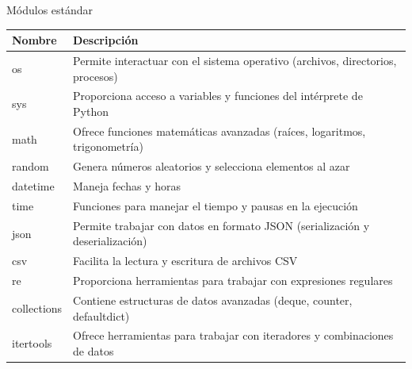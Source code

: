 \documentclass[11pt]{beamer}
\begin{document}
\begin{frame}{Módulos estándar}
	\scriptsize
	\begin{tabularx}{\linewidth}{>{\raggedright\arraybackslash}p{3.5cm} X}
		\toprule
		\textbf{Nombre} & \textbf{Descripción} \\
		\midrule
		os & Permite interactuar con el sistema operativo (archivos, directorios, procesos) \\
		sys & Proporciona acceso a variables y funciones del intérprete de Python \\
		math & Ofrece funciones matemáticas avanzadas (raíces, logaritmos, trigonometría) \\
		random & Genera números aleatorios y selecciona elementos al azar \\
		datetime & Maneja fechas y horas \\
		time & Funciones para manejar el tiempo y pausas en la ejecución \\
		json & Permite trabajar con datos en formato JSON (serialización y  deserialización) \\ 
		csv & Facilita la lectura y escritura de archivos CSV \\
		re & Proporciona herramientas para trabajar con expresiones regulares \\
		collections & Contiene estructuras de datos avanzadas (deque, counter, defaultdict) \\
		itertools & Ofrece herramientas para trabajar con iteradores y combinaciones de datos \\
		\bottomrule
	\end{tabularx}
\end{frame}
\end{document}
